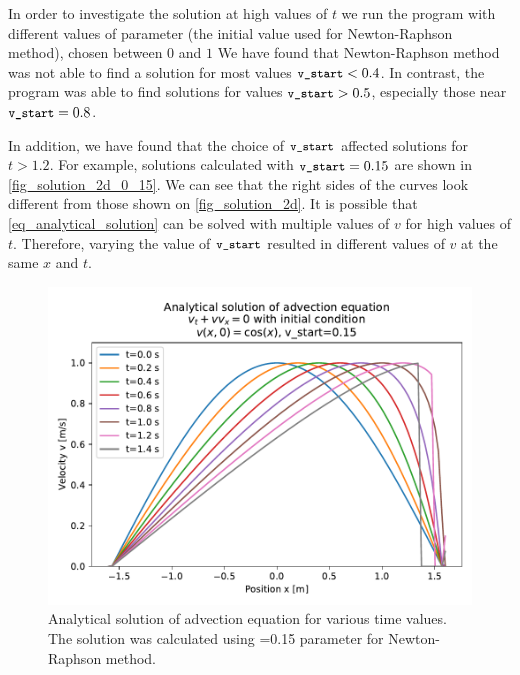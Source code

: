 In order to investigate the solution at high values of $t$ we run the program with different values of  parameter (the initial value used for Newton-Raphson method), chosen between $0$ and $1$ We have found that Newton-Raphson method was not able to find a solution for most values $\texttt{\small v\_start} < 0.4$. In contrast, the program was able to find solutions for values $\texttt{\small v\_start} > 0.5$, especially those near $\texttt{\small v\_start} = 0.8$.

In addition, we have found that the choice of $\texttt{\small v\_start}$ affected solutions for $t > 1.2$. For example, solutions calculated with $\texttt{\small v\_start}=0.15$ are shown in \autoref{fig_solution_2d_0_15}. We can see that the right sides of the curves look different from those shown on \autoref{fig_solution_2d}. It is possible that \autoref{eq_analytical_solution} can be solved with multiple values of $v$ for high values of $t$. Therefore, varying the value of $\texttt{\small v\_start}$ resulted in different values of $v$ at the same $x$ and $t$.
\begin{figure}[H]
  \centering
  \includegraphics[width=1.0\textwidth]{figures/advection_analytical_solution_2d_vstart_0_15.pdf}
  \caption{Analytical solution of advection equation for various time values. The solution was calculated using =0.15 parameter for Newton-Raphson method.}
  \label{fig_solution_2d_0_15}
\end{figure}